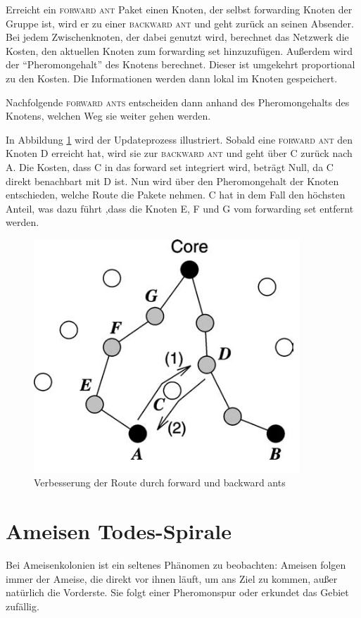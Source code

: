 Erreicht ein \textsc{forward ant} Paket einen Knoten, der selbst forwarding Knoten der Gruppe ist,
wird er zu einer \textsc{backward ant} und geht zurück an seinen Absender.
Bei jedem Zwischenknoten, der dabei genutzt wird,
berechnet das Netzwerk die Kosten, den aktuellen Knoten zum forwarding set hinzuzufügen.
Außerdem wird der ``Pheromongehalt'' 
des Knotens berechnet. Dieser ist umgekehrt proportional zu den Kosten.
Die Informationen werden dann lokal im Knoten gespeichert.

Nachfolgende \textsc{forward ants} entscheiden dann anhand des Pheromongehalts des Knotens, welchen Weg sie weiter gehen werden.

In Abbildung \ref{fig:MANSI2} wird der Updateprozess illustriert.
Sobald eine \textsc{forward ant} den Knoten D erreicht hat, wird sie zur \textsc{backward ant} und geht über C 
zurück nach A.
Die Kosten, dass C in das forward set integriert wird, beträgt Null,
da C direkt benachbart mit D ist.
Nun wird über den Pheromongehalt der Knoten entschieden, welche Route die Pakete nehmen.
C hat in dem Fall den höchsten Anteil, was dazu führt ,dass die Knoten E, F und G vom forwarding set entfernt werden.

\begin{center}
\begin{figure}[htbp]
 \includegraphics[width=10cm,keepaspectratio=true]{./images/adhoc2.png}
 \caption{Verbesserung der Route durch forward und backward ants}
\label{fig:MANSI2}
\end{figure}
\end{center}


\section{Ameisen Todes-Spirale}
Bei Ameisenkolonien ist ein seltenes Phänomen zu beobachten:
Ameisen folgen immer der Ameise, die direkt vor ihnen läuft, um ans Ziel zu kommen, außer natürlich die Vorderste.
Sie folgt einer Pheromonspur oder erkundet das Gebiet zufällig.

